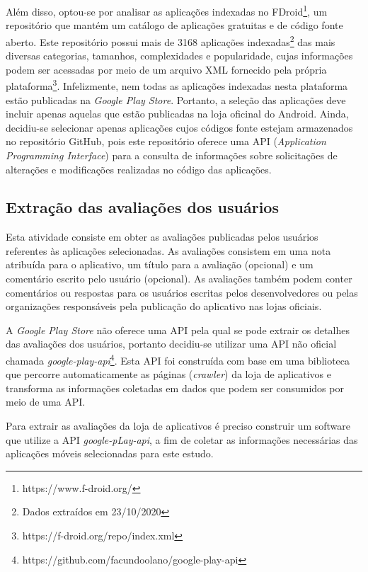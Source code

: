 Além disso, optou-se por analisar as aplicações indexadas no FDroid\footnote{https://www.f-droid.org/}, um repositório que mantém um catálogo de aplicações gratuitas e de código fonte aberto. Este repositório possui mais de 3168 aplicações indexadas\footnote{Dados extraídos em 23/10/2020} das mais diversas categorias, tamanhos, complexidades e popularidade, cujas informações podem ser acessadas por meio de um arquivo XML fornecido pela própria plataforma\footnote{https://f-droid.org/repo/index.xml}.
Infelizmente, nem todas as aplicações indexadas nesta plataforma estão publicadas na \textit{Google Play Store}. Portanto, a seleção das aplicações deve incluir apenas aquelas que estão publicadas na loja oficinal do Android. Ainda, decidiu-se selecionar apenas aplicações cujos códigos fonte estejam armazenados no repositório GitHub, pois este repositório oferece uma API (\textit{Application Programming Interface}) para a consulta de informações sobre solicitações de alterações e modificações realizadas no código das aplicações.


\subsection{Extração das avaliações dos usuários}
\label{sec:extracaoavaliacoes}

Esta atividade consiste em obter as avaliações publicadas pelos usuários referentes às aplicações selecionadas. As avaliações consistem em uma nota atribuída para o aplicativo, um título para a avaliação (opcional) e um comentário escrito pelo usuário (opcional). As avaliações também podem conter comentários ou respostas para os usuários escritas pelos desenvolvedores ou pelas organizações responsáveis pela publicação do aplicativo nas lojas oficiais. 

A \textit{Google Play Store} não oferece uma API pela qual se pode extrair os detalhes das avaliações dos usuários, portanto decidiu-se utilizar uma API não oficial chamada \textit{google-play-api}\footnote{https://github.com/facundoolano/google-play-api}. Esta API foi construída com base em uma biblioteca que percorre automaticamente as páginas (\textit{crawler}) da loja de aplicativos e transforma as informações coletadas em dados que podem ser consumidos por meio de uma API.

Para extrair as avaliações da loja de aplicativos é preciso construir um software que utilize a API \textit{google-pLay-api}, a fim de coletar as informações necessárias das aplicações móveis selecionadas para este estudo. 

